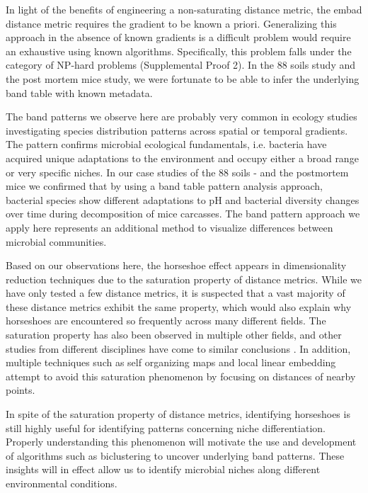 In light of the benefits of engineering a non-saturating distance metric, the \gls{embad} distance metric requires the gradient to be known a priori.  Generalizing this approach in the absence of known gradients is a difficult problem would require an exhaustive using known algorithms.  Specifically, this problem falls under the category of NP-hard problems (Supplemental Proof 2).  In the 88 soils study and the post mortem mice study, we were fortunate to be able to infer the underlying band table with known metadata.  \par
The band patterns we observe here are probably very common in ecology studies investigating species distribution patterns across spatial or temporal gradients. The pattern confirms microbial ecological fundamentals, i.e. bacteria have acquired unique adaptations to the environment and occupy either a broad range or very specific niches. In our case studies of the 88 soils - and the postmortem mice we confirmed that by using a band table pattern analysis approach, bacterial species show different adaptations to pH and bacterial diversity changes over time during decomposition of mice carcasses. The band pattern approach we apply here represents an additional method to visualize differences between microbial communities.\par
Based on our observations here, the horseshoe effect appears in dimensionality reduction techniques due to the saturation property of distance metrics.  While we have only tested a few distance metrics, it is suspected that a vast majority of these distance metrics exhibit the same property, which would also explain why horseshoes are encountered so frequently across many different fields. The saturation property has also been observed in multiple other fields, and other studies from different disciplines have come to similar conclusions \cite{horseshoe_kernel}. In addition, multiple techniques such as self organizing maps \cite{self_organizing_maps} and local linear embedding \cite{local_linear_embedding} attempt to avoid this saturation phenomenon by focusing on distances of nearby points.\par
In spite of the saturation property of distance metrics, identifying horseshoes is still highly useful for identifying patterns concerning niche differentiation.   Properly understanding this phenomenon will motivate the use and development of algorithms such as biclustering \cite{biclustering} to uncover underlying band patterns.  These insights will in effect allow us to identify microbial niches along different environmental conditions.\par
